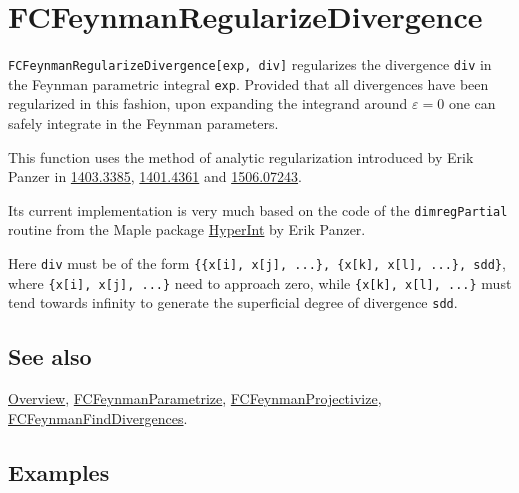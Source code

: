 \documentclass[../FeynCalcManual.tex]{subfiles}
\begin{document}
\hypertarget{fcfeynmanregularizedivergence}{
\section{FCFeynmanRegularizeDivergence}\label{fcfeynmanregularizedivergence}}

\texttt{FCFeynmanRegularizeDivergence[\allowbreak{}exp,\ \allowbreak{}div]}
regularizes the divergence \texttt{div} in the Feynman parametric
integral \texttt{exp}. Provided that all divergences have been
regularized in this fashion, upon expanding the integrand around
\(\varepsilon = 0\) one can safely integrate in the Feynman parameters.

This function uses the method of analytic regularization introduced by
Erik Panzer in \href{https://arxiv.org/abs/1403.3385}{1403.3385},
\href{https://arxiv.org/abs/1401.4361}{1401.4361} and
\href{https://arxiv.org/abs/1506.07243}{1506.07243}.

Its current implementation is very much based on the code of the
\texttt{dimregPartial} routine from the Maple package
\href{https://bitbucket.org/PanzerErik/hyperint/}{HyperInt} by Erik
Panzer.

Here \texttt{div} must be of the form
\texttt{\{\allowbreak{}\{\allowbreak{}x[\allowbreak{}i],\ \allowbreak{}x[\allowbreak{}j],\ \allowbreak{}...\},\ \allowbreak{}\{\allowbreak{}x[\allowbreak{}k],\ \allowbreak{}x[\allowbreak{}l],\ \allowbreak{}...\},\ \allowbreak{}sdd\}},
where
\texttt{\{\allowbreak{}x[\allowbreak{}i],\ \allowbreak{}x[\allowbreak{}j],\ \allowbreak{}...\}}
need to approach zero, while
\texttt{\{\allowbreak{}x[\allowbreak{}k],\ \allowbreak{}x[\allowbreak{}l],\ \allowbreak{}...\}}
must tend towards infinity to generate the superficial degree of
divergence \texttt{sdd}.

\subsection{See also}

\hyperlink{toc}{Overview},
\hyperlink{fcfeynmanparametrize}{FCFeynmanParametrize},
\hyperlink{fcfeynmanprojectivize}{FCFeynmanProjectivize},
\hyperlink{fcfeynmanfinddivergences}{FCFeynmanFindDivergences}.

\subsection{Examples}
\end{document}
